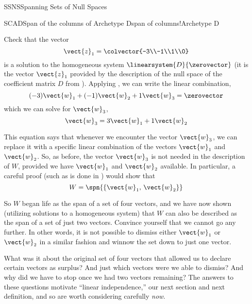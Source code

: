 \begin{subsect}{SSNS}{Spanning Sets of Null Spaces}
\begin{example}{SCAD}{Span of the columns of Archetype D}{span of columns!Archetype D}
%
\begin{para}Check that the vector
%
\begin{equation*}
\vect{z}_1=\colvector{-3\\-1\\1\\0}
\end{equation*}
%
is a solution to the homogeneous system $\linearsystem{D}{\zerovector}$ (it is the  vector $\vect{z}_1$ provided by the description of the null space of the coefficient matrix $D$ from ).  Applying , we can write the linear combination,
%
\begin{equation*}
(-3)\vect{w}_1+(-1)\vect{w}_2+1\vect{w}_3=\zerovector
\end{equation*}
%
which we can solve for $\vect{w}_3$,
%
\begin{equation*}
\vect{w}_3=3\vect{w}_1+1\vect{w}_2
\end{equation*}
\end{para}
%
\begin{para}This equation says that whenever we encounter the vector $\vect{w}_3$, we can replace it with a specific linear combination of the vectors $\vect{w}_1$ and $\vect{w}_2$.  So, as before, the vector $\vect{w}_3$ is not needed in the description of $W$, provided we have $\vect{w}_1$ and $\vect{w}_2$ available.  In particular, a careful proof (such as is done in ) would show that
%
\begin{equation*}
W=\spn{\left\{\vect{w}_1,\,\vect{w}_2\right\}}
\end{equation*}
\end{para}
%
\begin{para}So $W$ began life as the span of a set of four vectors, and we have now shown (utilizing solutions to a homogeneous system) that $W$ can also be described as the span of a set of just two vectors.  Convince yourself that we cannot go any further.  In other words, it is not possible to dismiss either $\vect{w}_1$ or $\vect{w}_2$ in a similar fashion and winnow the set down to just one vector.\end{para}
%
\begin{para}What was it about the original set of four vectors that allowed us to declare certain vectors as surplus?  And just which vectors were we able to dismiss?  And why did we have to stop once we had two vectors remaining?  The answers to these questions motivate ``linear independence,'' our next section and next definition, and so are worth considering carefully {\em now}.\end{para}
%
\end{example}
%
%
\end{subsect}
%
